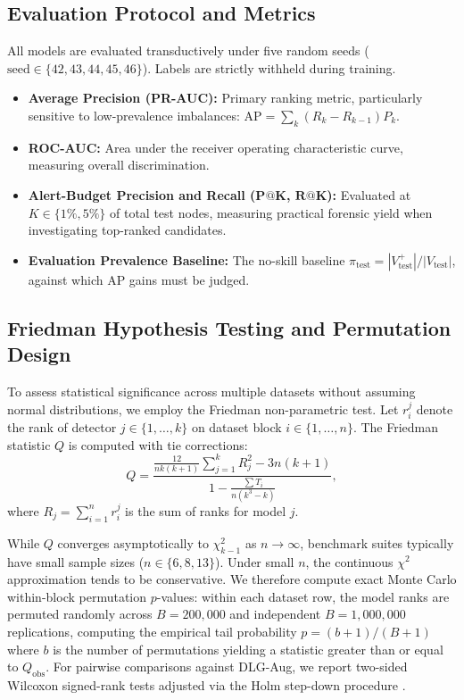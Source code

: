 \documentclass[applsci,article,submit,moreauthors,pdftex]{Definitions/mdpi}
\begin{document}
\subsection{Evaluation Protocol and Metrics}
All models are evaluated transductively under five random seeds ($\text{seed} \in \{42, 43, 44, 45, 46\}$). Labels are strictly withheld during training.
\begin{itemize}
    \item \textbf{Average Precision (PR-AUC):} Primary ranking metric, particularly sensitive to low-prevalence imbalances: $\mathrm{AP} = \sum_k (R_k - R_{k-1}) P_k$.
    \item \textbf{ROC-AUC:} Area under the receiver operating characteristic curve, measuring overall discrimination.
    \item \textbf{Alert-Budget Precision and Recall ($\mathbf{P@K}$, $\mathbf{R@K}$):} Evaluated at $K \in \{1\%, 5\%\}$ of total test nodes, measuring practical forensic yield when investigating top-ranked candidates.
    \item \textbf{Evaluation Prevalence Baseline:} The no-skill baseline $\pi_{\mathrm{test}} = |V_{\mathrm{test}}^+| / |V_{\mathrm{test}}|$, against which AP gains must be judged.
\end{itemize}

\subsection{Friedman Hypothesis Testing and Permutation Design}
To assess statistical significance across multiple datasets without assuming normal distributions, we employ the Friedman non-parametric test. Let $r_i^j$ denote the rank of detector $j \in \{1, \dots, k\}$ on dataset block $i \in \{1, \dots, n\}$. The Friedman statistic $Q$ is computed with tie corrections:
\begin{equation}
Q = \frac{\frac{12}{n k (k+1)} \sum_{j=1}^k R_j^2 - 3 n (k+1)}{1 - \frac{\sum T_i}{n(k^3 - k)}},
\label{eq:friedman_q}
\end{equation}
where $R_j = \sum_{i=1}^n r_i^j$ is the sum of ranks for model $j$. 

While $Q$ converges asymptotically to $\chi^2_{k-1}$ as $n \to \infty$, benchmark suites typically have small sample sizes ($n \in \{6, 8, 13\}$). Under small $n$, the continuous $\chi^2$ approximation tends to be conservative. We therefore compute exact Monte Carlo within-block permutation $p$-values: within each dataset row, the model ranks are permuted randomly across $B=200,000$ and independent $B=1,000,000$ replications, computing the empirical tail probability $p = (b + 1) / (B + 1)$ where $b$ is the number of permutations yielding a statistic greater than or equal to $Q_{\mathrm{obs}}$. For pairwise comparisons against DLG-Aug, we report two-sided Wilcoxon signed-rank tests adjusted via the Holm step-down procedure \cite{holm1979}.
\end{document}
